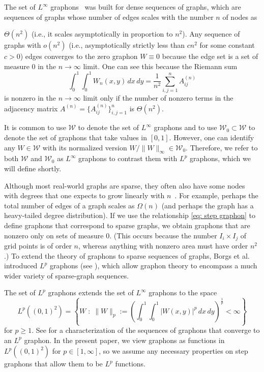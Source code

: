 \documentclass[11pt]{amsart}
\def\calW{\mathcal{W}}
\def\ra{\rightarrow}
\numberwithin{equation}{section}
\begin{document}
The set of $L^\infty$ graphons~\cite{lovasz2012large} was built for dense sequences of graphs, 
which are sequences of graphs whose number of edges scales with the number $n$ of nodes as {$\Theta(n^2)$ (i.e., it scales asymptotically in proportion to $n^2$). 
Any sequence of graphs with $o(n^2)$ (i.e., asymptotically strictly less than $cn^2$ for some constant $c > 0$) edges converges to the zero graphon $W \equiv 0$ because the edge set is a set of measure $0$ in the $n \ra \infty$ limit. One can see this because the Riemann sum
\begin{equation*}
    \int_0^1 \int_0^1 W_n(x,y) \, dx\,dy = \frac{1}{n^2} \sum_{i,j = 1}^n A^{(n)}_{ij}
\end{equation*}
is nonzero in the $n\ra \infty$ limit only if the number of nonzero terms in the adjacency matrix $A^{(n)} = \{A^{(n)}_{ij}\}_{i,j = 1}^n$ is {$\Theta(n^2)$.} 

It is common to use $\calW$ to denote the set of $L^\infty$ graphons and to use $\calW_0 \subset \calW$ to denote the set of graphons that take values in $[0,1]$. However, one can identify any $W \in \calW$ with its normalized version $W/\|W\|_\infty \in \calW_0$. Therefore, we refer to both $\calW$ and $\calW_0$ as $L^\infty$ graphons to contrast them with $L^p$ graphons, which we will define shortly.

Although most real-world graphs are sparse, they often also have some nodes with degrees that one expects to grow linearly with $n$~\cite{newman2018}. For example, perhaps the total number of edges of a graph scales as $\Omega(n)$ (and perhaps the graph has a heavy-tailed degree distribution). If we use the relationship \eqref{eq: step graphon} to define graphons that correspond to sparse graphs, we obtain graphons that are nonzero only on sets of measure $0$. (This occurs because the number $I_i \times I_j$  of grid points is of order $n$, whereas anything with nonzero area must have order $n^2$.) To extend the theory of graphons to sparse sequences of graphs, Borgs et al.~\cite{borgs2019LpI, borgs2018LpII} introduced $L^p$ graphons (see \cite[Definition 2.7]{borgs2019LpI}), which allow graphon theory to encompass a much wider variety of sparse-graph sequences.

The set of $L^p$ graphons extends the set of $L^\infty$ graphons to the space 
\begin{equation}
	L^p((0,1)^2) = \left\{W\; : \; \|W\|_p:=\left(\int_0^1\int_0^1 |W(x,y)|^p \,dx\,dy\right)^{\frac{1}{p}} < \infty \right\} 
\end{equation}
for $p \geq 1$.  See \cite[Theorem 2.8]{borgs2019LpI} for a characterization of the sequences of graphons that converge to an $L^p$ graphon. In the present paper, we view graphons as functions in $L^p((0,1)^2)$ for $p \in [1,\infty]$, 
{so} we assume any necessary properties on step graphons that allow them to be $L^p$ functions.
 
}
\end{document}
